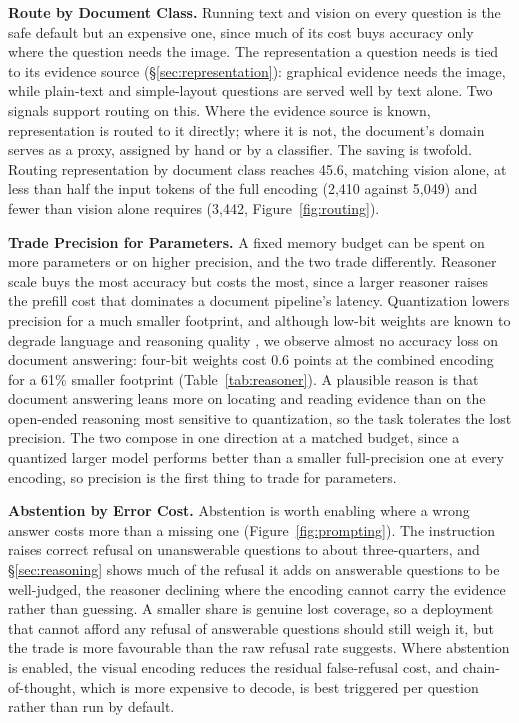 \documentclass[11pt]{article}
\begin{document}
\textbf{Route by Document Class.}
Running text and vision on every question is the safe default but an expensive one, since much of its cost buys accuracy only where the question needs the image. The representation a question needs is tied to its evidence source (\S\ref{sec:representation}): graphical evidence needs the image, while plain-text and simple-layout questions are served well by text alone. Two signals support routing on this. Where the evidence source is known, representation is routed to it directly; where it is not, the document's domain serves as a proxy, assigned by hand or by a classifier. The saving is twofold. Routing representation by document class reaches 45.6, matching vision alone, at less than half the input tokens of the full encoding (2{,}410 against 5{,}049) and fewer than vision alone requires (3{,}442, Figure~\ref{fig:routing}).

\textbf{Trade Precision for Parameters.}
A fixed memory budget can be spent on more parameters or on higher precision, and the two trade differently. Reasoner scale buys the most accuracy but costs the most, since a larger reasoner raises the prefill cost that dominates a document pipeline's latency. Quantization lowers precision for a much smaller footprint, and although low-bit weights are known to degrade language and reasoning quality \citep{wang2024qvlm,yuan2025efficientllm}, we observe almost no accuracy loss on document answering: four-bit weights cost 0.6 points at the combined encoding for a 61\% smaller footprint (Table~\ref{tab:reasoner}). A plausible reason is that document answering leans more on locating and reading evidence than on the open-ended reasoning most sensitive to quantization, so the task tolerates the lost precision. The two compose in one direction at a matched budget, since a quantized larger model performs better than a smaller full-precision one at every encoding, so precision is the first thing to trade for parameters.

\textbf{Abstention by Error Cost.}
Abstention is worth enabling where a wrong answer costs more than a missing one (Figure~\ref{fig:prompting}). The instruction raises correct refusal on unanswerable questions to about three-quarters, and \S\ref{sec:reasoning} shows much of the refusal it adds on answerable questions to be well-judged, the reasoner declining where the encoding cannot carry the evidence rather than guessing. A smaller share is genuine lost coverage, so a deployment that cannot afford any refusal of answerable questions should still weigh it, but the trade is more favourable than the raw refusal rate suggests. Where abstention is enabled, the visual encoding reduces the residual false-refusal cost, and chain-of-thought, which is more expensive to decode, is best triggered per question rather than run by default.
\end{document}
